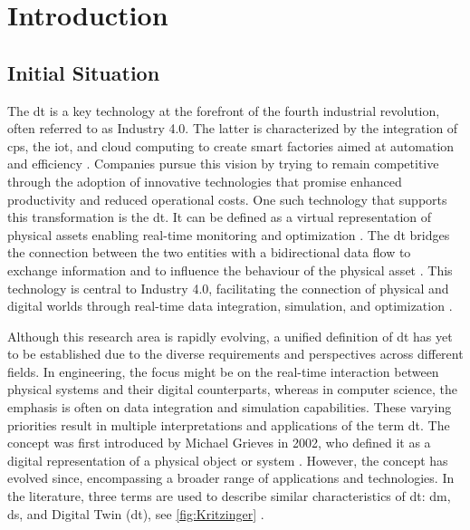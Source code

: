 \chapter{Introduction}
\label{chap:introduction}

\section{Initial Situation}
The \gls{dt} is a key technology at the forefront of the fourth industrial revolution, often referred to as Industry 4.0.
The latter is characterized by the integration of \gls{cps}, the \gls{iot}, and cloud computing to create smart factories aimed at automation and efficiency \autocite{Oztemel2020}. Companies pursue this vision by trying to remain competitive through the adoption of innovative technologies that promise enhanced productivity and reduced operational costs. One such technology that supports this transformation is the \gls{dt}. It can be defined as a virtual representation of physical assets enabling real-time monitoring and optimization \autocite{Tao2018ijamt}. The \gls{dt} bridges the connection between the two entities with a bidirectional data flow to exchange information and to influence the behaviour of the physical asset \autocite{grieves2014digital}. This technology is central to Industry 4.0, facilitating the connection of physical and digital worlds through real-time data integration, simulation, and optimization \autocite{judijanto2024trends}.

Although this research area is rapidly evolving, a unified definition of \gls{dt} has yet to be established due to the diverse requirements and perspectives across different fields. In engineering, the focus might be on the real-time interaction between physical systems and their digital counterparts, whereas in computer science, the emphasis is often on data integration and simulation capabilities. These varying priorities result in multiple interpretations and applications of the term \gls{dt}. The concept was first introduced by Michael Grieves in 2002, who defined it as a digital representation of a physical object or system \autocite{grieves2014digital}. However, the concept has evolved since, encompassing a broader range of applications and technologies. In the literature, three terms are used to describe similar characteristics of \gls{dt}: \gls{dm}, \gls{ds}, and Digital Twin (\gls{dt}), see \autoref{fig:Kritzinger} \autocite{jones2020characterising,Zhang2021jmsy}.

